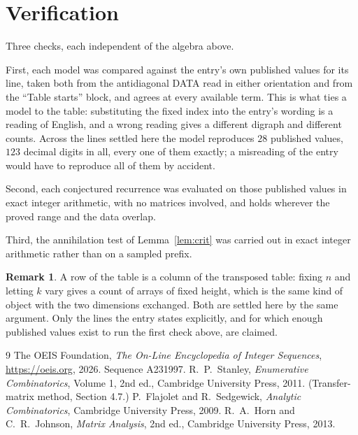 \documentclass[11pt,a4paper]{article}
\theoremstyle{plain}
\theoremstyle{definition}
\newtheorem{remark}[theorem]{Remark}
\begin{document}
\section{Verification}

Three checks, each independent of the algebra above.

First, each model was compared against the entry's own published values for its line, taken
both from the antidiagonal DATA read in either orientation and from the ``Table starts''
block, and agrees at every available term. This is what ties a model to the table:
substituting the fixed index into the entry's wording is a reading of English, and a wrong
reading gives a different digraph and different counts. Across the lines settled here the
model reproduces $28$ published values, $123$ decimal digits in all, every one of
them exactly; a misreading of the entry would have to reproduce all of them by accident.

Second, each conjectured recurrence was evaluated on those published values in exact
integer arithmetic, with no matrices involved, and holds wherever the proved range and the
data overlap.

Third, the annihilation test of Lemma~\ref{lem:crit} was carried out in exact integer
arithmetic rather than on a sampled prefix.

\begin{remark}
A row of the table is a column of the transposed table: fixing $n$ and letting $k$ vary gives a
count of arrays of fixed height, which is the same kind of object with the two dimensions
exchanged. Both are settled here by the same argument. Only the lines the entry states
explicitly, and for which enough published values exist to run the first check above, are
claimed.
\end{remark}

\begin{thebibliography}{9}
 The OEIS Foundation, \emph{The On-Line Encyclopedia of Integer
Sequences}, \url{https://oeis.org}, 2026. Sequence A231997.
 R.~P.~Stanley, \emph{Enumerative Combinatorics}, Volume 1, 2nd ed.,
Cambridge University Press, 2011. (Transfer-matrix method, Section 4.7.)
 P.~Flajolet and R.~Sedgewick, \emph{Analytic Combinatorics}, Cambridge
University Press, 2009.
 R.~A.~Horn and C.~R.~Johnson, \emph{Matrix Analysis}, 2nd ed., Cambridge
University Press, 2013.
\end{thebibliography}
\end{document}
